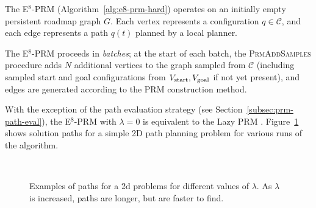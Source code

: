 The E$^8$-PRM (Algorithm~\ref{alg:e8-prm-hard})
operates on an initially empty persistent roadmap graph $G$.
Each vertex represents a configuration $q \in \mathcal{C}$,
and each edge represents a path $q(t)$ planned by a local planner.

The E$^8$-PRM proceeds in \emph{batches};
at the start of each batch,
the \textsc{PrmAddSamples} procedure adds
$N$ additional vertices to the graph sampled from $\mathcal{C}$
(including sampled start and goal configurations from
$V_{\mbox{\scriptsize start}}, V_{\mbox{\scriptsize goal}}$
if not yet present),
and edges are generated according to the PRM construction method.

With the exception of the path evaluation strategy
(see Section~\ref{subsec:prm-path-eval}),
the E$^8$-PRM with $\lambda = 0$
is equivalent to 
the Lazy PRM \citep{bohlin2000lazyprm}.
Figure~\ref{fig:bean} shows solution paths for a simple
2D path planning problem for various runs of the algorithm.

\begin{figure}
   \centering
   \,
   \caption{Examples of paths for a 2d problems
      for different values of $\lambda$.
      As $\lambda$ is increased,
      paths are longer, but are faster to find.}
   \label{fig:bean}
\end{figure}

